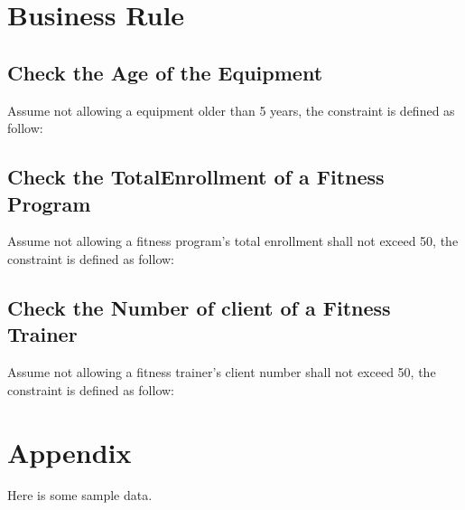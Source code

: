 \documentclass[12pt,letterpaper,titlepage,en-US]{article}
\begin{document}
\section{Business Rule}
\subsection{Check the Age of the Equipment}
Assume not allowing a equipment older than 5 years, the constraint is defined as follow:


\subsection{Check the TotalEnrollment of a Fitness Program}
Assume not allowing a fitness program's total enrollment shall not exceed 50,
the constraint is defined as follow:


\subsection{Check the Number of client of a Fitness Trainer}
Assume not allowing a fitness trainer's client number shall not exceed 50,
the constraint is defined as follow:


\section{Appendix}
Here is some sample data.

\end{document}
